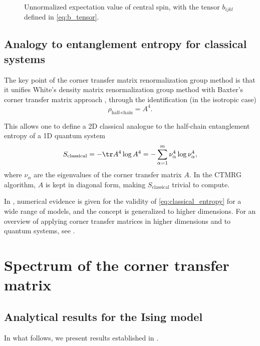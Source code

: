\begin{figure}
  
  \caption{Unnormalized expectation value of central spin, with the tensor $b_{i j k l}$ defined in \autoref{eq:b_tensor}.}
  \label{fig:magnetization_central_spin_tensor_network}
\end{figure}

\subsection{Analogy to entanglement entropy for classical systems}
The key point of the corner transfer matrix renormalization group method \cite{nishino1997corner, nishino1996corner} is
that it unifies White's density matrix renormalization group method \cite{white1992density} with Baxter's corner
transfer matrix approach \cite{baxter1968dimers, baxter1978variational}, through the identification (in the isotropic
case)
\begin{equation}\label{eq:correspondence_density_matrix_ctm}
  \rho_{\text{half-chain}} = A^4.
\end{equation}

This allows one to define a 2D classical analogue to the half-chain entanglement entropy of a 1D quantum system
\begin{equation}\label{eq:classical_entropy}
  S_{\text{classical}} = - \tr A^4 \log A^4 = - \sum_{\alpha=1}^{m} \nu_{\alpha}^4 \log \nu_{\alpha}^4,
\end{equation}
where $\nu_{\alpha}$ are the eigenvalues of the corner transfer matrix $A$.
In the CTMRG algorithm, $A$ is kept in diagonal form, making $S_{\text{classical}}$ trivial to compute.

In \cite{huang2017holographic}, numerical evidence is given for the validity of \autoref{eq:classical_entropy} for a
wide range of models, and the concept is generalized to higher dimensions. For an overview of applying corner transfer
matrices in higher dimensions and to quantum systems, see \cite{orus2012exploring}.


\section{Spectrum of the corner transfer matrix}\label{sec:spectrum_of_ctm}

\subsection{Analytical results for the Ising model}
In what follows, we present results established in \cite{peschel2009reduced, peschel1999density}.

